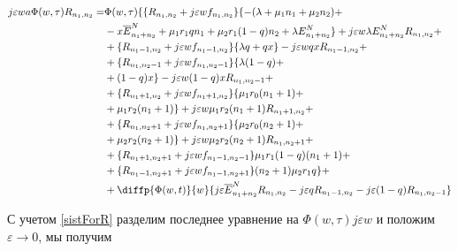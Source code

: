 \begin{equation*}
	\begin{split}
		j\varepsilon wa \Phi (w,\tau)R_{n_{1}, n_{2}}=
		&\Phi (w,\tau)\{\{R_{n_{1}, n_{2}}+j\varepsilon w f_{n_{1}, n_{2}}\}\{-(\lambda+\mu_{1}n_{1}+\mu_{2}n_{2}) +\\
		&-x\overline{E}_{n_{1}+n_{2}}^N+\mu_{1}r_{1}q n_{1}+ \mu_{2}r_{1}(1-q)n_{2}+ \lambda E_{n_{1}+n_{2}}^N\} +j\varepsilon w \lambda E_{n_{1}+n_{2}}^NR_{n_{1}, n_{2}} +\\
		&+\{R_{n_{1}-1, n_{2}}+j\varepsilon w f_{n_{1}-1, n_{2}}\}\{\lambda q+ q  x\}-j\varepsilon wq xR_{n_{1}-1, n_{2}}+\\
		&+\{R_{n_{1}, n_{2}-1}+j\varepsilon w f_{n_{1}, n_{2}-1}\}\{\lambda (1-q) +\\
		&+ (1-q) x\} -j\varepsilon w(1-q) xR_{n_{1}, n_{2}-1} +\\
		&+ \{R_{n_{1}+1, n_{2}}+j\varepsilon w f_{n_{1}+1, n_{2}}\}\{\mu_{1} r_{0}(n_{1}+1)+\\
		& + \mu_{1} r_{2}(n_{1}+1)\}+j\varepsilon w\mu_{1} r_{2}(n_{1}+1)R_{n_{1}+1, n_{2}}+\\
		&+ \{R_{n_{1}, n_{2}+1}+j\varepsilon w f_{n_{1}, n_{2}+1}\}\{\mu_{2} r_{0}(n_{2}+1)+\\
		& + \mu_{2} r_{2} (n_{2}+1)\} +j\varepsilon w\mu_{2} r_{2} (n_{2}+1)R_{n_{1}, n_{2}+1}+\\
		&+\{R_{n_{1}+1, n_{2}+1}+j\varepsilon w f_{n_{1}-1, n_{2}-1}\}\mu_{1} r_{1}(1-q)(n_{1}+1) +\\
		&+\{R_{n_{1}-1, n_{2}+1}+j\varepsilon w f_{n_{1}-1, n_{2}+1}\}(n_{2}+1)\mu_{2} r_{1}q\}  +\\
		&+ \diffp{\Phi(w,t)}{w}\{j\varepsilon \overline{E}_{n_{1}+n_{2}}^NR_{n_{1}, n_{2}}-  j\varepsilon q R_{n_{1}-1, n_{2}}-j \varepsilon (1-q) R_{n_{1}, n_{2}-1}\}
	\end{split}
\end{equation*}

С учетом \eqref{sistForR} разделим последнее уравнение на $\Phi (w, \tau)j\varepsilon w$ и положим $\varepsilon \rightarrow 0$, мы получим

